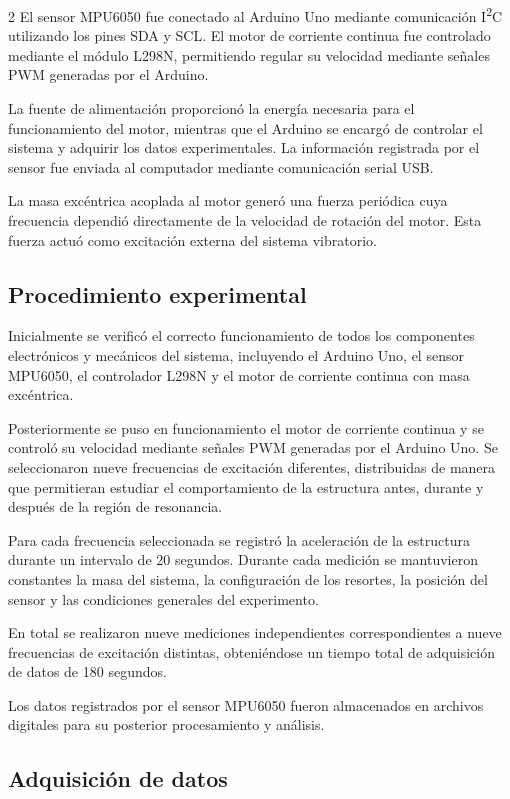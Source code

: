 \documentclass[10pt]{article}
\begin{document}
\begin{multicols}{2}
El sensor MPU6050 fue conectado al Arduino Uno mediante comunicación I\textsuperscript{2}C utilizando los pines SDA y SCL. El motor de corriente continua fue controlado mediante el módulo L298N, permitiendo regular su velocidad mediante señales PWM generadas por el Arduino.

La fuente de alimentación proporcionó la energía necesaria para el funcionamiento del motor, mientras que el Arduino se encargó de controlar el sistema y adquirir los datos experimentales. La información registrada por el sensor fue enviada al computador mediante comunicación serial USB.

La masa excéntrica acoplada al motor generó una fuerza periódica cuya frecuencia dependió directamente de la velocidad de rotación del motor. Esta fuerza actuó como excitación externa del sistema vibratorio.

\subsection{Procedimiento experimental}

Inicialmente se verificó el correcto funcionamiento de todos los componentes electrónicos y mecánicos del sistema, incluyendo el Arduino Uno, el sensor MPU6050, el controlador L298N y el motor de corriente continua con masa excéntrica.

Posteriormente se puso en funcionamiento el motor de corriente continua y se controló su velocidad mediante señales PWM generadas por el Arduino Uno. Se seleccionaron nueve frecuencias de excitación diferentes, distribuidas de manera que permitieran estudiar el comportamiento de la estructura antes, durante y después de la región de resonancia.

Para cada frecuencia seleccionada se registró la aceleración de la estructura durante un intervalo de 20 segundos. Durante cada medición se mantuvieron constantes la masa del sistema, la configuración de los resortes, la posición del sensor y las condiciones generales del experimento.

En total se realizaron nueve mediciones independientes correspondientes a nueve frecuencias de excitación distintas, obteniéndose un tiempo total de adquisición de datos de 180 segundos.

Los datos registrados por el sensor MPU6050 fueron almacenados en archivos digitales para su posterior procesamiento y análisis.

\subsection{Adquisición de datos}


\end{multicols}
\end{document}

